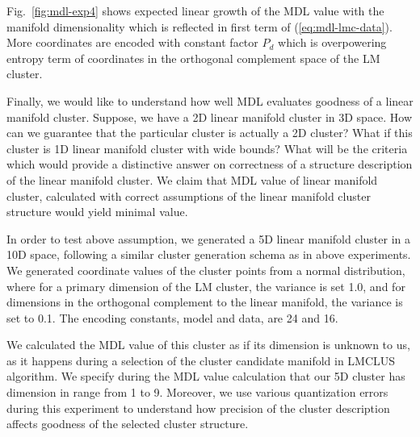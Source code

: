 Fig.~\ref{fig:mdl-exp4} shows expected linear growth of the MDL value with
the manifold dimensionality which is reflected in first term
of (\ref{eq:mdl-lmc-data}). More coordinates are encoded with constant factor
$P_d$ which is overpowering entropy term of coordinates in the orthogonal
complement space of the LM cluster.
\fi

Finally, we would like to understand how well MDL evaluates goodness of
a linear manifold cluster. Suppose, we have a 2D linear manifold cluster in
3D space. How can we guarantee that the particular cluster is actually
a 2D cluster? What if this cluster is 1D linear manifold cluster with
wide bounds? What will be the criteria which would provide a distinctive answer
on correctness of a structure description of the linear manifold cluster.
We claim that MDL value of linear manifold cluster, calculated with correct
assumptions of the linear manifold cluster structure would yield minimal value.

In order to test above assumption, we generated a 5D linear manifold cluster in
a 10D space, following a similar cluster generation schema as in above experiments.
We generated coordinate values of the cluster points from a normal distribution,
where for a primary dimension of the LM cluster, the variance is set 1.0, and
for dimensions in the orthogonal complement to the linear manifold, the variance
is set to 0.1. The encoding constants, model and data, are 24 and 16.

We calculated the MDL value of this cluster as if its dimension is unknown
to us, as it happens during a selection of the cluster candidate manifold
in LMCLUS algorithm. We specify during the MDL value calculation that our
5D cluster has dimension in range from 1 to 9. Moreover, we use various
quantization errors during this experiment to understand how precision of
the cluster description affects goodness of the selected cluster structure.

